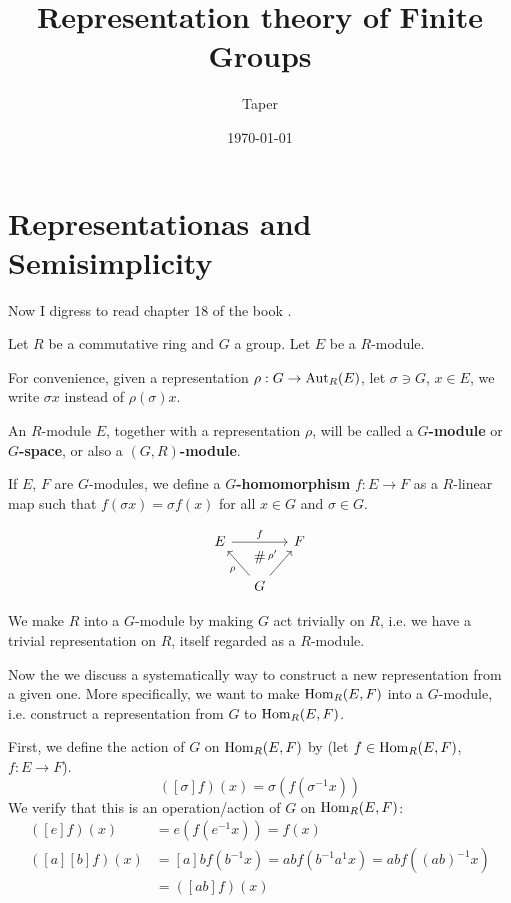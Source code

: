 \documentclass{article}
\title{Representation theory of Finite Groups}
\date{\today}
\author{Taper}
\begin{document}
\maketitle
{}
\tableofcontents

\section{Representationas and Semisimplicity}
\label{sec:Representationas-and-Semisimplicity}

Now I digress to read chapter 18 of the book \cite{lang-algebra}.

Let $R$ be a commutative ring and $G$ a group. Let $E$ be a
$R$-module.

For convenience, given a representation $\rho:G\to \operatorname{Aut}_R(E)$, let
$\sigma\ni G$, $x\in E$, we write $\sigma x$ instead of
$\rho(\sigma)x$.

An $R$-module $E$, together with a representation $\rho$, will be
called a \textbf{$G$-module} or
\textbf{$G$-space}, or also a
\textbf{$(G,R)$-module}.

If $E$, $F$ are $G$-modules, we define a
\textbf{$G$-homomorphism}
$f:E\to F$ as a $R$-linear map such that $f(\sigma x) = \sigma f(x)$
for all $x\in G$ and $\sigma\in G$.

\begin{equation}
    \begin{tikzcd}[column sep=small]
        E \ar[rr,"f"] &
        \ar[d,phantom, "\#", near start] & F \\
        & G\ar[ul,"\rho"]\ar[ur,"\rho'"] &  \,
    \end{tikzcd}
\end{equation}

We make $R$ into a $G$-module by making $G$ act trivially on $R$, i.e.
we have a trivial representation on $R$, itself regarded as a
$R$-module.

\begin{key}
Now the we discuss a systematically way to construct a new
representation from a given one. More specifically, we want to make
$\operatorname{Hom}_R(E,F)$ into a $G$-module, i.e. construct a representation from
$G$ to $\operatorname{Hom}_R(E,F)$.

First, we define the action of $G$ on $\operatorname{Hom}_R(E,F)$ by (let $f\in
\operatorname{Hom}_R(E,F)$, $f: E\to F$).
\begin{equation}
    ([\sigma] f) (x) = \sigma (f(\sigma^{-1}x))
\end{equation}
We verify that this is an operation/action of $G$ on $\operatorname{Hom}_R(E,F)$:
\begin{align*}
    ([e] f) (x) &= e (f(e^{-1}x)) = f(x) \\
    ([a] [b] f )(x) &= [a] bf(b^{-1}x) = ab f(b^{-1}a^{1}x) =
    abf((ab)^{-1}x) \\
    &= ([ab] f)(x)
\end{align*}
\end{key}
\end{document}
